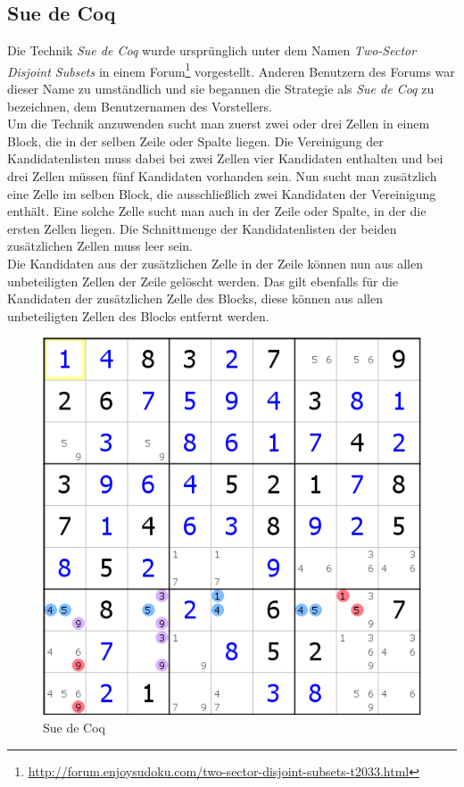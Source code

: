 \newpage
\subsection{Sue de Coq}
Die Technik \textit{Sue de Coq} wurde ursprünglich unter dem Namen \textit{Two-Sector Disjoint Subsets} in einem Forum\footnote{\url{http://forum.enjoysudoku.com/two-sector-disjoint-subsets-t2033.html}} vorgestellt. Anderen Benutzern des Forums war dieser Name zu umständlich und sie begannen die Strategie als \textit{Sue de Coq} zu bezeichnen, dem Benutzernamen des Vorstellers.\\
Um die Technik anzuwenden sucht man zuerst zwei oder drei Zellen in einem Block, die in der selben Zeile oder Spalte liegen. Die Vereinigung der Kandidatenlisten muss dabei bei zwei Zellen vier Kandidaten enthalten und bei drei Zellen müssen fünf Kandidaten vorhanden sein. Nun sucht man zusätzlich eine Zelle im selben Block, die ausschließlich zwei Kandidaten der Vereinigung enthält. Eine solche Zelle sucht man auch in der Zeile oder Spalte, in der die ersten Zellen liegen. Die Schnittmenge der Kandidatenlisten der beiden zusätzlichen Zellen muss leer sein. \\
Die Kandidaten aus der zusätzlichen Zelle in der Zeile können nun aus allen unbeteiligten Zellen der Zeile gelöscht werden.  Das gilt ebenfalls für die Kandidaten der zusätzlichen Zelle des Blocks, diese können aus allen unbeteiligten Zellen des Blocks entfernt werden.\\

\begin{figure}[h]
\begin{center}
\includegraphics{./img/Sue_de_Coq.png}
\caption{Sue de Coq}
\end{center}
\end{figure}

